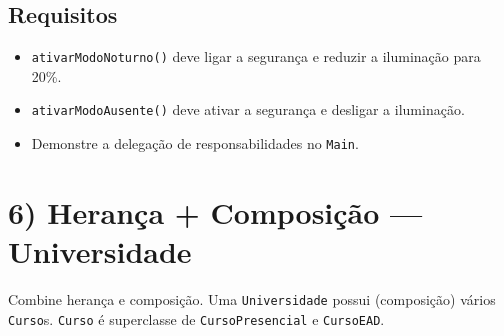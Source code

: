 \documentclass[12pt]{article}
\begin{document}
\subsection*{Requisitos}
\begin{itemize}
    \item \texttt{ativarModoNoturno()} deve ligar a segurança e reduzir a iluminação para 20\%.
    \item \texttt{ativarModoAusente()} deve ativar a segurança e desligar a iluminação.
    \item Demonstre a delegação de responsabilidades no \texttt{Main}.
\end{itemize}

\section*{6) Herança + Composição — Universidade}
Combine herança e composição. Uma \texttt{Universidade} possui (composição) vários \texttt{Curso}s. \texttt{Curso} é superclasse de \texttt{CursoPresencial} e \texttt{CursoEAD}.
\end{document}
